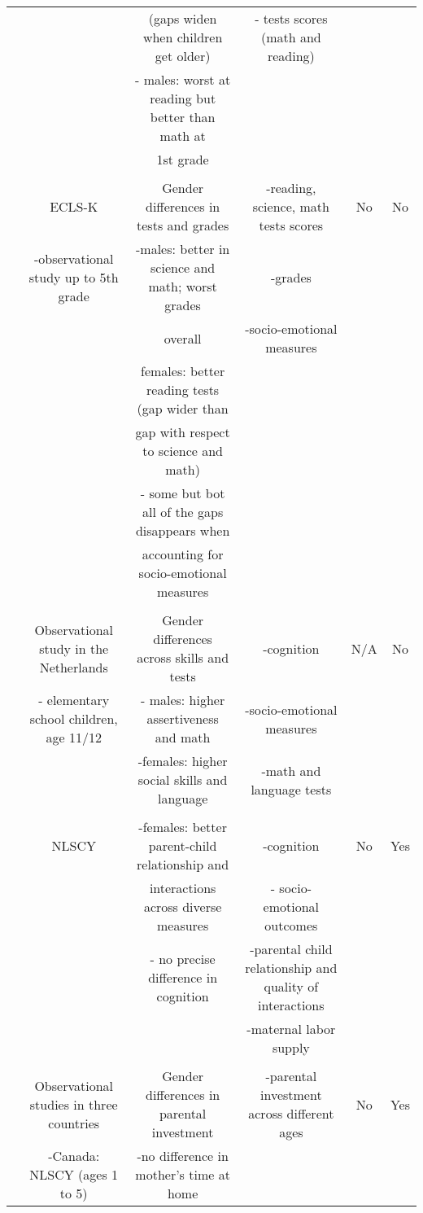 \begin{tabular}{cccccc}
	&		&	(gaps widen when children get older)	&	- tests scores (math and reading)	&		&		\\ 
	&		&	- males: worst at reading but better than math at 	&		&		&		\\ 
	&		&	1st grade	&		&		&		\\ \\ \midrule
\citet{Cornwell_Mustard_VanParys_2013_TJHR}	&	ECLS-K 	&	Gender differences in tests and grades	&	-reading, science, math tests scores 	&	No	&	No	\\ 
	&	-observational study up to 5th grade	&	-males: better in science and math; worst grades	&	-grades	&		&		\\ 
	&		&	overall 	&	-socio-emotional measures	&		&		\\ 
	&		&	females: better reading tests (gap wider than 	&		&		&		\\ 
	&		&	gap with respect to science and math)	&		&		&		\\ 
	&		&	- some but bot all of the gaps disappears when	&		&		&		\\ 
	&		&	accounting for socio-emotional measures 	&		&		&		\\ \\ \midrule
\citet{Golsteyn_Schils_2014_EER}	&	Observational study in the Netherlands	&	Gender differences across skills and tests	&	-cognition	&	N/A 	&	No	\\ 
	&	- elementary school children, age 11/12 	&	- males: higher assertiveness and math	&	-socio-emotional measures	&		&		\\ 
	&		&	-females: higher social skills and language	&	-math and language tests	&		&		\\ \\ \midrule
\citet{Kottelenberg_Lehrer_2014_Gender-Effects}	&	NLSCY	&	-females: better parent-child relationship and 	&	-cognition	&	No	&	Yes	\\ 
	&		&	interactions across diverse measures	&	- socio-emotional outcomes	&		&		\\ 
	&		&	- no precise difference in cognition	&	-parental child relationship and quality of interactions	&		&		\\ 
	&		&		&	-maternal labor supply	&		&		\\ \\ \midrule
\citet{Baker-Milligan_2013_Boy-Girl-Differences}	&	Observational studies in three countries	&	Gender differences in parental investment 	&	-parental investment across different ages	&	No	&	Yes	\\ 
	&	-Canada: NLSCY (ages 1 to 5)	&	-no difference in mother's time at home 	&		&		&		\\ 

\end{tabular}
